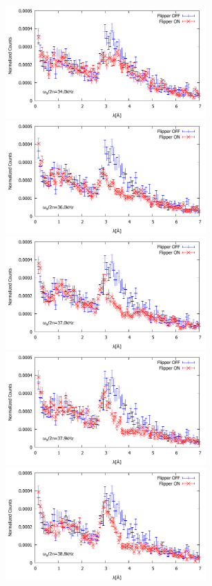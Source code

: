 \begin{figure}[h]
\includegraphics[height=4.3cm]{resonance/analysis/Flipper1_NormalizedCounts_340kHz.pdf}
\includegraphics[height=4.3cm]{resonance/analysis/Flipper1_NormalizedCounts_360kHz.pdf}\\
\includegraphics[height=4.3cm]{resonance/analysis/Flipper1_NormalizedCounts_370kHz.pdf}
\includegraphics[height=4.3cm]{resonance/analysis/Flipper1_NormalizedCounts_379kHz.pdf}\\
\includegraphics[height=4.3cm]{resonance/analysis/Flipper1_NormalizedCounts_388kHz.pdf}

\end{figure}
